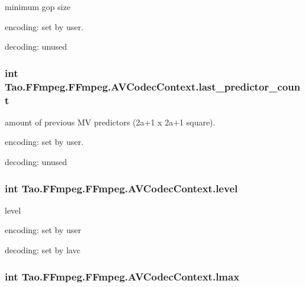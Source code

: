 \label{struct_tao_1_1_f_fmpeg_1_1_f_fmpeg_1_1_a_v_codec_context_a2532421bd1bed4aa71df89d5ac3c5bd2}
minimum gop size
\begin{DoxyItemize}
\item encoding: set by user.
\item decoding: unused 
\end{DoxyItemize}\hypertarget{struct_tao_1_1_f_fmpeg_1_1_f_fmpeg_1_1_a_v_codec_context_a750d6fbf14f517080d5ce832aac32177}{
\subsubsection[{last\_\-predictor\_\-count}]{\setlength{\rightskip}{0pt plus 5cm}int {\bf Tao.FFmpeg.FFmpeg.AVCodecContext.last\_\-predictor\_\-count}}}
\label{struct_tao_1_1_f_fmpeg_1_1_f_fmpeg_1_1_a_v_codec_context_a750d6fbf14f517080d5ce832aac32177}
amount of previous MV predictors (2a+1 x 2a+1 square).
\begin{DoxyItemize}
\item encoding: set by user.
\item decoding: unused 
\end{DoxyItemize}\hypertarget{struct_tao_1_1_f_fmpeg_1_1_f_fmpeg_1_1_a_v_codec_context_aa1b133cf61b525ab7989d0d08baaa06c}{
\subsubsection[{level}]{\setlength{\rightskip}{0pt plus 5cm}int {\bf Tao.FFmpeg.FFmpeg.AVCodecContext.level}}}
\label{struct_tao_1_1_f_fmpeg_1_1_f_fmpeg_1_1_a_v_codec_context_aa1b133cf61b525ab7989d0d08baaa06c}
level
\begin{DoxyItemize}
\item encoding: set by user
\item decoding: set by lavc 
\end{DoxyItemize}\hypertarget{struct_tao_1_1_f_fmpeg_1_1_f_fmpeg_1_1_a_v_codec_context_a286fe23442a5234acb944d210b518795}{
\subsubsection[{lmax}]{\setlength{\rightskip}{0pt plus 5cm}int {\bf Tao.FFmpeg.FFmpeg.AVCodecContext.lmax}}}
